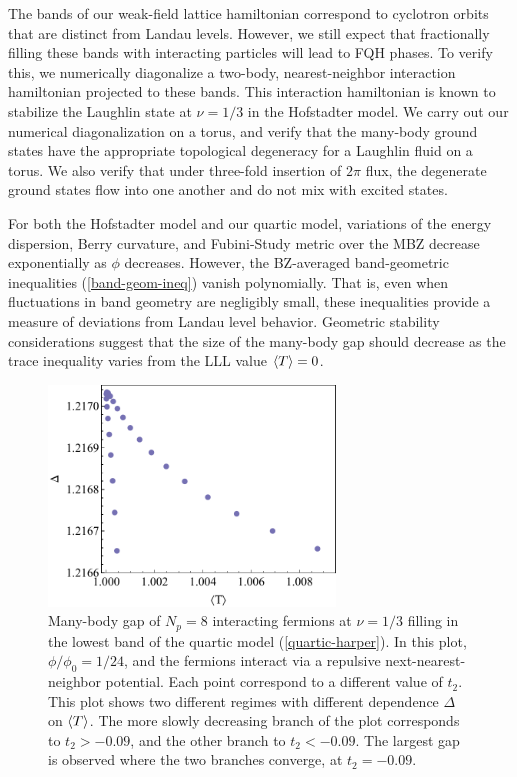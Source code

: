 \documentclass[aps,prb,twocolumn,letterpaper,twoside,nobalancelastpage,groupedaddress,amsmath,amssymb,floatfix,citeautoscript]{revtex4-1}
\begin{document}
The bands of our weak-field lattice hamiltonian correspond to cyclotron orbits that are distinct from Landau levels. However, we still expect that fractionally filling these bands with interacting particles will lead to FQH phases. To verify this, we numerically diagonalize a two-body, nearest-neighbor interaction hamiltonian projected to these bands. This interaction hamiltonian is known to stabilize the Laughlin state at $\nu = 1/3$ in the Hofstadter model. We carry out our numerical diagonalization on a torus, and verify that the many-body ground states have the appropriate topological degeneracy for a Laughlin fluid on a torus. We also verify that under three-fold insertion of $2\pi$ flux, the degenerate ground states flow into one another and do not mix with excited states.

For both the Hofstadter model and our quartic model, variations of the energy dispersion, Berry curvature, and Fubini-Study metric over the MBZ decrease exponentially as $\phi$ decreases\cite{Harper:2014vi,bauer_quantum_2016}. However, the BZ-averaged band-geometric inequalities (\ref{band-geom-ineq}) vanish polynomially. That is, even when fluctuations in band geometry are negligibly small, these inequalities provide a measure of deviations from Landau level behavior. Geometric stability considerations \cite{jackson_geometric_2015} suggest that the size of the many-body gap should decrease as the trace inequality varies from the LLL value $\expval{T}=0$.

\begin{figure}[thb]
\centering
\includegraphics[width=3.0in]{gap-v-trace-delta.pdf}
\caption{\label{gap-v-trace-delta-plot}Many-body gap of $N_p=8$ interacting fermions at $\nu=1/3$ filling in the lowest band of the quartic model (\ref{quartic-harper}). In this plot, $\phi/\phi_0=1/24$, and the fermions interact via a repulsive next-nearest-neighbor potential. Each point correspond to a different value of $t_2$. This plot shows two different regimes with different dependence $\Delta$ on $\expval{T}$. The more slowly decreasing branch of the plot corresponds to $t_2 > -0.09$, and the other branch to $t_2 < -0.09$. The largest gap is observed where the two branches converge, at $t_2 = -0.09$.}
\end{figure}
\end{document}
